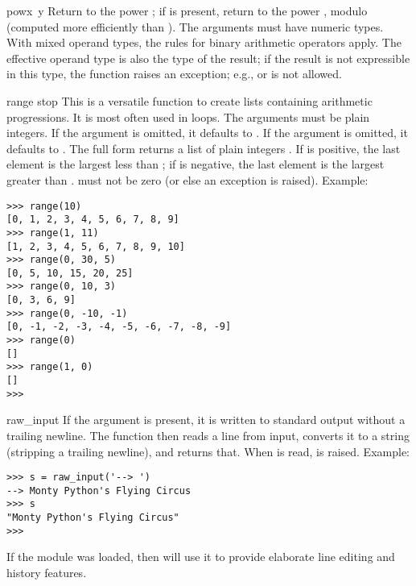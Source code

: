 \begin{funcdesc}{pow}{x\, y}
  Return  to the power ; if  is present, return
   to the power , modulo  (computed more
  efficiently than ).
  The arguments must have
  numeric types.  With mixed operand types, the rules for binary
  arithmetic operators apply.  The effective operand type is also the
  type of the result; if the result is not expressible in this type, the
  function raises an exception; e.g.,  or  is not allowed.
\end{funcdesc}

\begin{funcdesc}{range}{ stop}
  This is a versatile function to create lists containing arithmetic
  progressions.  It is most often used in  loops.  The
  arguments must be plain integers.  If the  argument is
  omitted, it defaults to .  If the  argument is
  omitted, it defaults to .  The full form returns a list of
  plain integers .  If  is positive,
  the last element is the largest  less than ; if  is negative, the last
  element is the largest 
  greater than .   must not be zero (or else an
  exception is raised).  Example:

\bcode\begin{verbatim}
>>> range(10)
[0, 1, 2, 3, 4, 5, 6, 7, 8, 9]
>>> range(1, 11)
[1, 2, 3, 4, 5, 6, 7, 8, 9, 10]
>>> range(0, 30, 5)
[0, 5, 10, 15, 20, 25]
>>> range(0, 10, 3)
[0, 3, 6, 9]
>>> range(0, -10, -1)
[0, -1, -2, -3, -4, -5, -6, -7, -8, -9]
>>> range(0)
[]
>>> range(1, 0)
[]
>>> 
\end{verbatim}\ecode
\end{funcdesc}

\begin{funcdesc}{raw_input}{}
  If the  argument is present, it is written to standard output
  without a trailing newline.  The function then reads a line from input,
  converts it to a string (stripping a trailing newline), and returns that.
  When \EOF{} is read,  is raised. Example:

\bcode\begin{verbatim}
>>> s = raw_input('--> ')
--> Monty Python's Flying Circus
>>> s
"Monty Python's Flying Circus"
>>> 
\end{verbatim}\ecode

If the  module was loaded, then
 will use it to provide elaborate
line editing and history features.
\end{funcdesc}

